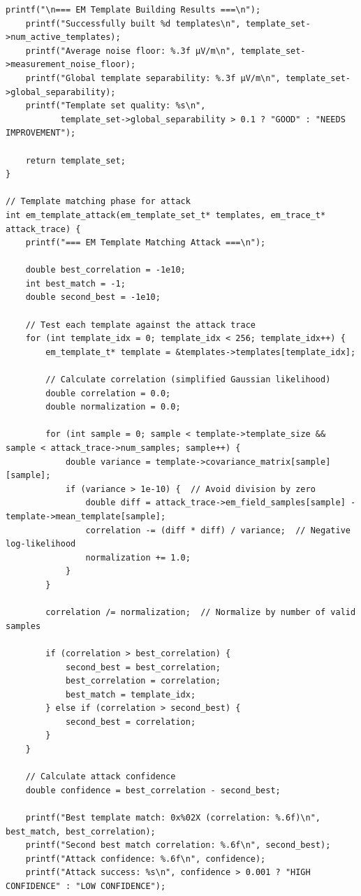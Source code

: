 \documentclass[11pt,a4paper]{article}
\theoremstyle{definition}
\begin{document}
\begin{lstlisting}[caption={Complete EM Template Building Implementation}]
    printf("\n=== EM Template Building Results ===\n");
    printf("Successfully built %d templates\n", template_set->num_active_templates);
    printf("Average noise floor: %.3f μV/m\n", template_set->measurement_noise_floor);
    printf("Global template separability: %.3f μV/m\n", template_set->global_separability);
    printf("Template set quality: %s\n", 
           template_set->global_separability > 0.1 ? "GOOD" : "NEEDS IMPROVEMENT");
    
    return template_set;
}

// Template matching phase for attack
int em_template_attack(em_template_set_t* templates, em_trace_t* attack_trace) {
    printf("=== EM Template Matching Attack ===\n");
    
    double best_correlation = -1e10;
    int best_match = -1;
    double second_best = -1e10;
    
    // Test each template against the attack trace
    for (int template_idx = 0; template_idx < 256; template_idx++) {
        em_template_t* template = &templates->templates[template_idx];
        
        // Calculate correlation (simplified Gaussian likelihood)
        double correlation = 0.0;
        double normalization = 0.0;
        
        for (int sample = 0; sample < template->template_size && sample < attack_trace->num_samples; sample++) {
            double variance = template->covariance_matrix[sample][sample];
            if (variance > 1e-10) {  // Avoid division by zero
                double diff = attack_trace->em_field_samples[sample] - template->mean_template[sample];
                correlation -= (diff * diff) / variance;  // Negative log-likelihood
                normalization += 1.0;
            }
        }
        
        correlation /= normalization;  // Normalize by number of valid samples
        
        if (correlation > best_correlation) {
            second_best = best_correlation;
            best_correlation = correlation;
            best_match = template_idx;
        } else if (correlation > second_best) {
            second_best = correlation;
        }
    }
    
    // Calculate attack confidence
    double confidence = best_correlation - second_best;
    
    printf("Best template match: 0x%02X (correlation: %.6f)\n", best_match, best_correlation);
    printf("Second best match correlation: %.6f\n", second_best);
    printf("Attack confidence: %.6f\n", confidence);
    printf("Attack success: %s\n", confidence > 0.001 ? "HIGH CONFIDENCE" : "LOW CONFIDENCE");
    

\end{lstlisting}
\end{document}
